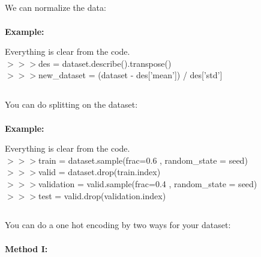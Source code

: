 \documentclass[a4paper,18pt]{article}
\begin{document}

\subsection{\colorbox {matgreen}{\color{white}{\large Normalizing}}}
We can normalize the data:\\\\
\textbf{Example:\\}

Everything is clear from the code.\\

$>>>$des = dataset.describe().transpose()\\

$>>>$new\_dataset = (dataset - des['mean']) / des['std']


\subsection{\colorbox {matgreen}{\color{white}{\large Test,Train Split}}}
You can do splitting on the dataset:\\\\
\textbf{Example:\\}

Everything is clear from the code.\\

$>>>$train = dataset.sample(frac=0.6 , random\_state = seed)\\

$>>>$valid = dataset.drop(train.index)\\

$>>>$validation = valid.sample(frac=0.4 , random\_state = seed)\\

$>>>$test = valid.drop(validation.index)\\


\subsection{\colorbox {matgreen}{\color{white}{\large One Hot Encoding}}}
You can do a one hot encoding by two ways for your dataset:\\\\
\textbf{Method I:\\}
\end{document}
